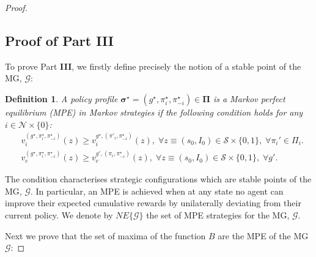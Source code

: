 \documentclass{article}
\newtheorem{definition}{Definition}
\begin{document}
\begin{proof}
\subsection*{Proof of Part \textbf{III}}
To prove Part \textbf{III}, we firstly define precisely the notion of a stable point of the MG, $\mathcal{G}$:
\begin{definition}
A policy profile $\boldsymbol{\sigma^\star}=(g^\star,\pi^\star_i,\pi_{-i}^\star)\in\boldsymbol{\Pi}$ is a Markov perfect equilibrium (MPE) in Markov strategies if the following condition holds for any $i\in\mathcal{N}\times\{0\}$:
\begin{align}\label{MP_NE_condition}
&v_i^{(g^\star,\pi^\star_i,\pi^\star_{-i})}(z)\geq v_i^{g^\star,(\pi'_i,\pi^\star_{-i})}(z), \; \forall z\equiv (s_0,I_0)\in \mathcal{S}\times\{0,1\}, \;\forall \pi_i'\in\Pi_i.
\\&v_c^{(g^\star,\pi^\star_i,\pi^\star_{-i})}(z)\geq v_c^{g',(\pi_i,\pi^\star_{-i})}(z), \; \forall z\equiv (s_0,I_0)\in \mathcal{S}\times\{0,1\}, \;\forall g'.\end{align}
\end{definition}
The condition characterises strategic configurations which are stable points of the MG, $\mathcal{G}$. In particular, an MPE is achieved when at any state no agent can improve their expected cumulative rewards by unilaterally deviating from their current policy. We denote by $NE\{\mathcal{G}\}$ the set of MPE strategies for the MG, $\mathcal{G}$.

Next we prove that the set of maxima of the function $B$ are the MPE of the MG $\mathcal{G}$:


\end{proof}
\end{document}

